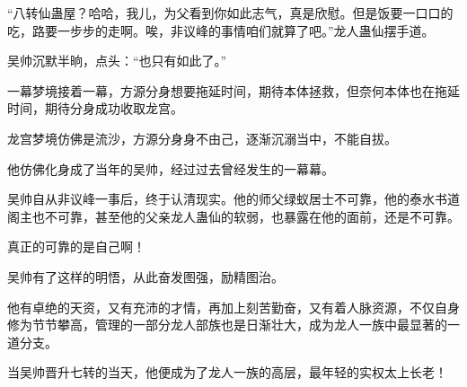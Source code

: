 \begin{this_body}
“八转仙蛊屋？哈哈，我儿，为父看到你如此志气，真是欣慰。但是饭要一口口的吃，路要一步步的走啊。唉，非议峰的事情咱们就算了吧。”龙人蛊仙摆手道。

吴帅沉默半晌，点头：“也只有如此了。”

一幕梦境接着一幕，方源分身想要拖延时间，期待本体拯救，但奈何本体也在拖延时间，期待分身成功收取龙宫。

龙宫梦境仿佛是流沙，方源分身身不由己，逐渐沉溺当中，不能自拔。

他仿佛化身成了当年的吴帅，经过过去曾经发生的一幕幕。

吴帅自从非议峰一事后，终于认清现实。他的师父绿蚁居士不可靠，他的泰水书道阁主也不可靠，甚至他的父亲龙人蛊仙的软弱，也暴露在他的面前，还是不可靠。

真正的可靠的是自己啊！

吴帅有了这样的明悟，从此奋发图强，励精图治。

他有卓绝的天资，又有充沛的才情，再加上刻苦勤奋，又有着人脉资源，不仅自身修为节节攀高，管理的一部分龙人部族也是日渐壮大，成为龙人一族中最显著的一道分支。

当吴帅晋升七转的当天，他便成为了龙人一族的高层，最年轻的实权太上长老！

\end{this_body}


